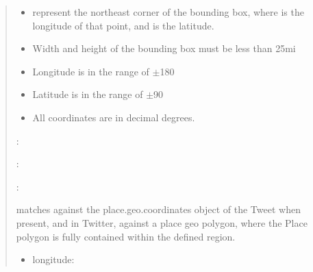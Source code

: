 \documentclass[letterpaper,10pt,english]{sphinxmanual}
\begin{document}
\begin{quote}
\begin{itemize}
\item {} 
\sphinxAtStartPar
{} represent the northeast corner of the bounding box, where  is the longitude of that point, and  is the latitude.

\item {} 
\sphinxAtStartPar
Width and height of the bounding box must be less than 25mi

\item {} 
\sphinxAtStartPar
Longitude is in the range of \(\pm\)180

\item {} 
\sphinxAtStartPar
Latitude is in the range of \(\pm\)90

\item {} 
\sphinxAtStartPar
All coordinates are in decimal degrees.

\end{itemize}

\begin{DUlineblock}{0em}
\item[] : 
\item[] : 
\end{DUlineblock}

\begin{DUlineblock}{0em}
\item[] \sphinxhyphen{} :
\item[] matches against the place.geo.coordinates object of the Tweet when present, and in Twitter, against a place geo polygon, where the Place polygon is fully contained within the defined region.
\end{DUlineblock}
\begin{itemize}
\item {} \begin{description}
\item[{longitude:}] \leavevmode
{}


\end{description}
\end{itemize}
\end{quote}
\end{document}
